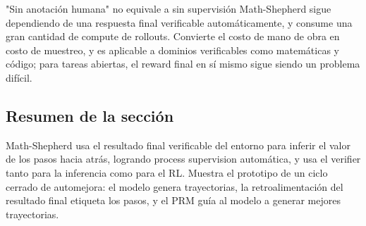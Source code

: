 \begin{warningbox}{"Sin anotación humana" no equivale a sin supervisión}
Math-Shepherd sigue dependiendo de una respuesta final verificable automáticamente, y consume una gran cantidad de compute de rollouts. Convierte el costo de mano de obra en costo de muestreo, y es aplicable a dominios verificables como matemáticas y código; para tareas abiertas, el reward final en sí mismo sigue siendo un problema difícil.
\end{warningbox}

\subsection{Resumen de la sección}

Math-Shepherd usa el resultado final verificable del entorno para inferir el valor de los pasos hacia atrás, logrando process supervision automática, y usa el verifier tanto para la inferencia como para el RL. Muestra el prototipo de un ciclo cerrado de automejora: el modelo genera trayectorias, la retroalimentación del resultado final etiqueta los pasos, y el PRM guía al modelo a generar mejores trayectorias.
